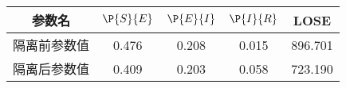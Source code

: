 \begin{tabular}{ccccc}
\hline
参数名&$\P{S}{E}$&$\P{E}{I}$&$\P{I}{R}$&LOSE\\
\hline
隔离前参数值&0.476&0.208&0.015&896.701\\
隔离后参数值&0.409&0.203&0.058&723.190\\
\hline
\end{tabular}